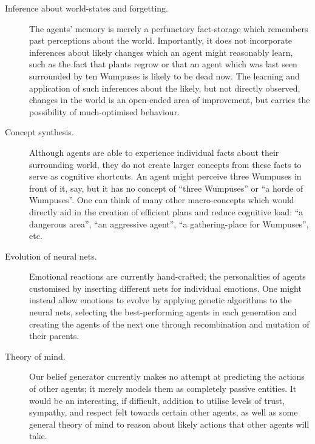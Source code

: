 \begin{description}
	 \item[Inference about world-states and forgetting.] The agents' memory is merely a perfunctory fact-storage which remembers past perceptions about the world. Importantly, it does not incorporate inferences about likely changes which an agent might reasonably learn, such as the fact that plants regrow or that an agent which was last seen surrounded by ten Wumpuses is likely to be dead now. The learning and application of such inferences about the likely, but not directly observed, changes in the world is an open-ended area of improvement, but carries the possibility of much-optimised behaviour.
	 
	 \item[Concept synthesis.] Although agents are able to experience individual facts about their surrounding world, they do not create larger concepts from these facts to serve as cognitive shortcuts. An agent might perceive three Wumpuses in front of it, say, but it has no concept of ``three Wumpuses'' or ``a horde of Wumpuses''. One can think of many other macro-concepts which would directly aid in the creation of efficient plans and reduce cognitive load: ``a dangerous area'', ``an aggressive agent'', ``a gathering-place for Wumpuses'', etc.
	 
	 \item[Evolution of neural nets.] Emotional reactions are currently hand-crafted; the personalities of agents customised by inserting different nets for individual emotions. One might instead allow emotions to evolve by applying genetic algorithms to the neural nets, selecting the best-performing agents in each generation and creating the agents of the next one through recombination and mutation of their parents.
	 
	 \item[Theory of mind.] Our belief generator currently makes no attempt at predicting the actions of other agents; it merely models them as completely passive entities. It would be an interesting, if difficult, addition to utilise levels of trust, sympathy, and respect felt towards certain other agents, as well as some general theory of mind to reason about likely actions that other agents will take.
\end{description}
